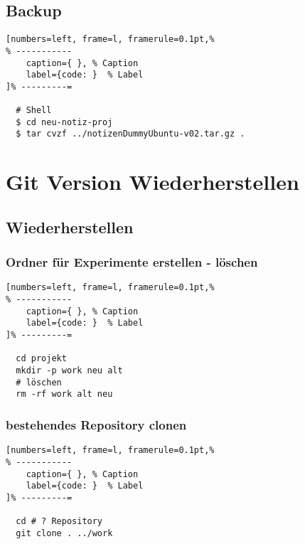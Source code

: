 \subsection{Backup}\label{backup}

\lstset{language=Bash} %
\begin{lstlisting}[numbers=left, frame=l, framerule=0.1pt,%
% -----------
	caption={ }, % Caption
	label={code: }  % Label
]% ---------=

  # Shell
  $ cd neu-notiz-proj
  $ tar cvzf ../notizenDummyUbuntu-v02.tar.gz .
\end{lstlisting}

\section{Git Version
Wiederherstellen}\label{git-version-wiederherstellen}

\subsection{Wiederherstellen}\label{wiederherstellen}

\subsubsection{Ordner für Experimente erstellen -
löschen}\label{ordner-fuer-experimente-erstellen-loeschen}

\lstset{language=Bash} %
\begin{lstlisting}[numbers=left, frame=l, framerule=0.1pt,%
% -----------
	caption={ }, % Caption
	label={code: }  % Label
]% ---------=

  cd projekt
  mkdir -p work neu alt
  # löschen
  rm -rf work alt neu
\end{lstlisting}

\subsubsection{bestehendes Repository
clonen}\label{bestehendes-repository-clonen}

\lstset{language=Bash} %
\begin{lstlisting}[numbers=left, frame=l, framerule=0.1pt,%
% -----------
	caption={ }, % Caption
	label={code: }  % Label
]% ---------=

  cd # ? Repository
  git clone . ../work
\end{lstlisting}

